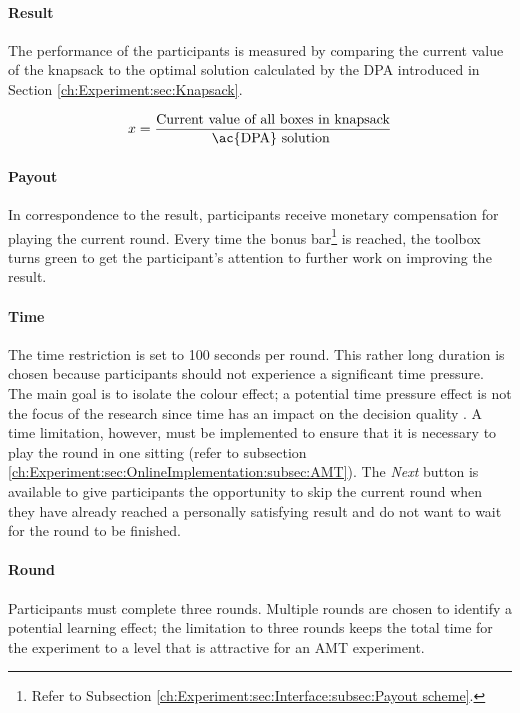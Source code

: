 \paragraph{Result}

The performance of the participants is measured by comparing the current value of the knapsack to the optimal solution calculated by the \ac{DPA} introduced in Section \ref{ch:Experiment:sec:Knapsack}.
  
\begin{equation}
x = \dfrac{\text{Current value of all boxes in knapsack}}{\text{\ac{DPA} solution }}
\label{eq:x}
\end{equation}

\paragraph{Payout}

In correspondence to the result, participants receive monetary compensation for playing the current round. Every time the bonus bar\footnote{Refer to Subsection \ref{ch:Experiment:sec:Interface:subsec:Payout scheme}.} is reached, the toolbox turns green to get the participant's attention to further work on improving the result.

\paragraph{Time}
The time restriction is set to 100 seconds per round. This rather long duration is chosen because participants should not experience a significant time pressure. The main goal is to isolate the colour effect; a potential time pressure effect is not the focus of the research since time has an impact on the decision quality \citep{Hahn2006}. A time limitation, however, must be implemented to ensure that it is necessary to play the round in one sitting (refer to subsection  \ref{ch:Experiment:sec:OnlineImplementation:subsec:AMT}).
The \textit{Next} button is available to give participants the opportunity to skip the current round when they have already reached a personally satisfying result and do not want to wait for the round to be finished.
\paragraph{Round}
Participants must complete three rounds. Multiple rounds are chosen to identify a potential learning effect; the limitation to three rounds keeps the total time for the experiment to a level that is attractive for an \acf{AMT} experiment. 


